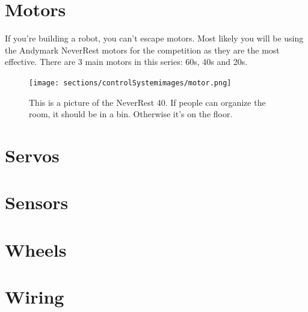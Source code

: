 \documentclass[../main.tex]{subfiles}
\begin{document}
\section{Motors}
If you're building a robot, you can't escape motors. Most likely you will be using the Andymark NeverRest motors for the competition as they are the most effective. There are 3 main motors in this series: 60s,  40s and 20s. 
\begin{figure}[H]
	\texttt{[image: sections/controlSystemimages/motor.png]}
	\caption{This is a picture of the NeverRest 40. If people can organize the room, it should be in a bin. Otherwise it's on the floor.}
\end{figure}
\section{Servos}
\section{Sensors}
\section{Wheels}
\section{Wiring}
\end{document}
